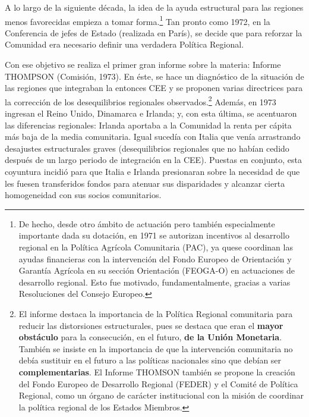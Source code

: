 \documentclass[10pt,a4paper]{article}
\begin{document}
A lo largo de la siguiente década, la idea de la ayuda estructural para las regiones menos favorecidas empieza a tomar forma.\footnote{%
    De hecho, desde otro ámbito de actuación pero también especialmente importante dada su dotación, en 1971 se autorizan incentivos al desarrollo regional en la Política Agrícola Comunitaria (PAC), ya quese coordinan las ayudas financieras con la intervención del Fondo Europeo de Orientación y Garantía Agrícola en su sección Orientación (FEOGA-O) en actuaciones de desarrollo regional. Esto fue motivado, fundamentalmente,  gracias a varias Resoluciones del Consejo Europeo.
} Tan pronto como 1972, en la Conferencia de jefes de Estado (realizada en París), se decide que para reforzar la Comunidad era necesario definir una verdadera Política Regional. 

Con ese objetivo se realiza el primer gran informe sobre la materia: Informe THOMPSON (Comisión, 1973). En éste, se hace un diagnóstico de la situación de las regiones que integraban la entonces CEE y se proponen varias directrices para la corrección de los desequilibrios regionales observados.\footnote{%
    El informe destaca la importancia de la Política Regional comunitaria para reducir las distorsiones estructurales, pues se destaca que eran el \textbf{mayor obstáculo} para la consecución, en el futuro, \textbf{de la Unión Monetaria}. También se insiste en la importancia de que la intervención comunitaria no debía sustituir en el futuro a las políticas nacionales sino que debían ser \textbf{complementarias}. El Informe THOMSON también se propone la creación del Fondo Europeo de Desarrollo Regional (FEDER) y el Comité de Política Regional, como un órgano de carácter institucional con la misión de coordinar la política regional de los Estados Miembros.
} Además, en 1973 ingresan el Reino Unido, Dinamarca e Irlanda; y, con esta última, se acentuaron las diferencias regionales: Irlanda aportaba a la Comunidad la renta per cápita más baja de la media comunitaria. Igual sucedía con Italia que venía arrastrando desajustes estructurales graves (desequilibrios regionales que no habían cedido después de un largo periodo de integración en la CEE). Puestas en conjunto, esta coyuntura incidió para que Italia e Irlanda presionaran sobre la necesidad de que les fuesen transferidos fondos para atenuar sus disparidades y alcanzar cierta homogeneidad con sus socios comunitarios.
\end{document}
